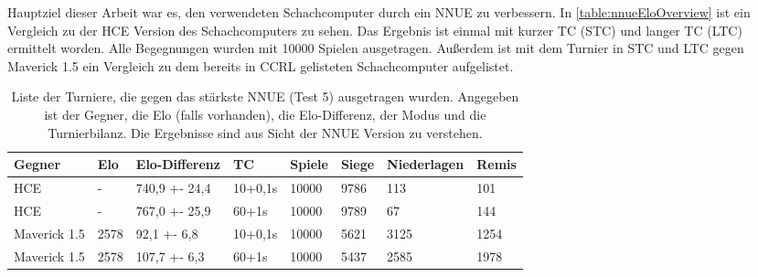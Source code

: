 Hauptziel dieser Arbeit war es, den verwendeten Schachcomputer durch ein \ac{NNUE} zu verbessern. In \autoref{table:nnueEloOverview} ist ein Vergleich zu der \ac{HCE} Version des Schachcomputers zu sehen. Das Ergebnis ist einmal mit kurzer \ac{TC} (\ac{STC}) und langer \ac{TC} (\ac{LTC}) ermittelt worden. Alle Begegnungen wurden mit 10000 Spielen ausgetragen. Außerdem ist mit dem Turnier in \ac{STC} und \ac{LTC} gegen Maverick 1.5 ein Vergleich zu dem bereits in \ac{CCRL} \cite{CCRL} gelisteten Schachcomputer aufgelistet.

\begin{table}[ht]
  \caption{Liste der Turniere, die gegen das stärkste \ac{NNUE} (Test 5) ausgetragen wurden. Angegeben ist der Gegner, die Elo (falls vorhanden), die Elo-Differenz, der Modus und die Turnierbilanz. Die Ergebnisse sind aus Sicht der \ac{NNUE} Version zu verstehen.}
  \label{table:nnueEloOverview}
  \renewcommand{\arraystretch}{1.2}
  \centering
  \sffamily
  \begin{footnotesize}
    \begin{tabular}{l l l l l l l l}
      \toprule
      \textbf{Gegner} & \textbf{Elo} & \textbf{Elo-Differenz} & \textbf{\ac{TC}} & \textbf{Spiele} & \textbf{Siege} & \textbf{Niederlagen} & \textbf{Remis} \\
      \midrule
      HCE             & -            & 740,9 +- 24,4         & 10+0,1s          & 10000           & 9786           & 113                  & 101            \\
      HCE             & -            & 767,0 +- 25,9         & 60+1s            & 10000           & 9789           & 67                   & 144            \\
      Maverick 1.5    & 2578         & 92,1  +- 6,8           & 10+0,1s          & 10000           & 5621           & 3125                 & 1254           \\
      Maverick 1.5    & 2578         & 107,7 +- 6,3          & 60+1s            & 10000           & 5437           & 2585                 & 1978           \\
      \bottomrule
    \end{tabular}
  \end{footnotesize}
  \rmfamily
\end{table}
